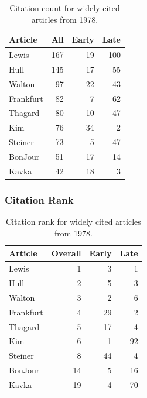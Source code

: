 \documentclass[
  10pt,
  letterpaper,
  DIV=11,
  numbers=noendperiod,
  twoside]{scrartcl}
\begin{document}
\begin{longtable}[]{@{}lrrr@{}}

\caption{\label{tbl-citation-count-1978}Citation count for widely cited
articles from 1978.}

\tabularnewline

\toprule\noalign{}
Article & All & Early & Late \\
\midrule\noalign{}
\endhead
\bottomrule\noalign{}
\endlastfoot
Lewis & 167 & 19 & 100 \\
Hull & 145 & 17 & 55 \\
Walton & 97 & 22 & 43 \\
Frankfurt & 82 & 7 & 62 \\
Thagard & 80 & 10 & 47 \\
Kim & 76 & 34 & 2 \\
Steiner & 73 & 5 & 47 \\
BonJour & 51 & 17 & 14 \\
Kavka & 42 & 18 & 3 \\

\end{longtable}

\subsubsection*{Citation Rank}\label{citation-rank-2}

\begin{longtable}[]{@{}lrrr@{}}

\caption{\label{tbl-citation-rank-1978}Citation rank for widely cited
articles from 1978.}

\tabularnewline

\toprule\noalign{}
Article & Overall & Early & Late \\
\midrule\noalign{}
\endhead
\bottomrule\noalign{}
\endlastfoot
Lewis & 1 & 3 & 1 \\
Hull & 2 & 5 & 3 \\
Walton & 3 & 2 & 6 \\
Frankfurt & 4 & 29 & 2 \\
Thagard & 5 & 17 & 4 \\
Kim & 6 & 1 & 92 \\
Steiner & 8 & 44 & 4 \\
BonJour & 14 & 5 & 16 \\
Kavka & 19 & 4 & 70 \\

\end{longtable}
\end{document}
